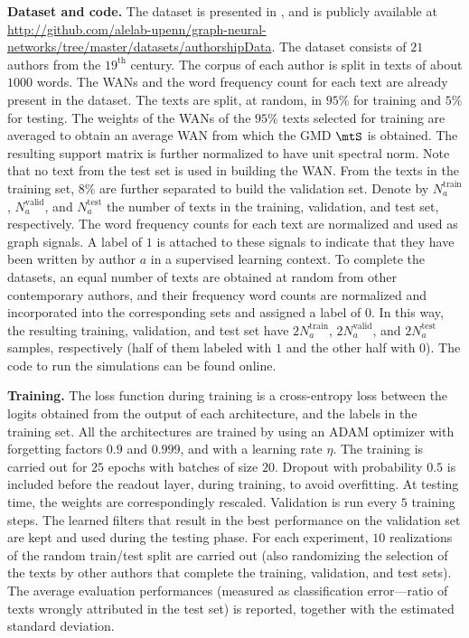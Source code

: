 \textbf{Dataset and code.} The dataset is presented in \cite{Segarra2015-Authorship}, and is publicly available at \url{http://github.com/alelab-upenn/graph-neural-networks/tree/master/datasets/authorshipData}. The dataset consists of $21$ authors from the $\text{19}^{\text{th}}$ century. The corpus of each author is split in texts of about $1000$ words. The WANs and the word frequency count for each text are already present in the dataset. The texts are split, at random, in $95\%$ for training and $5\%$ for testing. The weights of the WANs of the $95\%$ texts selected for training are averaged to obtain an average WAN from which the GMD $\mtS$ is obtained. The resulting support matrix is further normalized to have unit spectral norm. Note that no text from the test set is used in building the WAN. From the texts in the training set, $8\%$ are further separated to build the validation set. Denote by $N_{a}^{\text{train}}$, $N_{a}^{\text{valid}}$, and $N_{a}^{\text{test}}$ the number of texts in the training, validation, and test set, respectively.  The word frequency counts for each text are normalized and used as graph signals. A label of $1$ is attached to these signals to indicate that they have been written by author $a$ in a supervised learning context. To complete the datasets, an equal number of texts are obtained at random from other contemporary authors, and their frequency word counts are normalized and incorporated into the corresponding sets and assigned a label of $0$. In this way, the resulting training, validation, and test set have $2N_{a}^{\text{train}}$, $2N_{a}^{\text{valid}}$, and $2N_{a}^{\text{test}}$ samples, respectively (half of them labeled with $1$ and the other half with $0$). The code to run the simulations can be found online.

\textbf{Training.} The loss function during training is a cross-entropy loss between the logits obtained from the output of each architecture, and the labels in the training set. All the architectures are trained by using an ADAM optimizer \cite{Kingma15-ADAM} with forgetting factors $0.9$ and $0.999$, and with a learning rate $\eta$. The training is carried out for $25$ epochs with batches of size $20$. Dropout with probability $0.5$ is included before the readout layer, during training, to avoid overfitting. At testing time, the weights are correspondingly rescaled. Validation is run every $5$ training steps. The learned filters that result in the best performance on the validation set are kept and used during the testing phase. For each experiment, $10$ realizations of the random train/test split are carried out (also randomizing the selection of the texts by other authors that complete the training, validation, and test sets). The average evaluation performances (measured as classification error---ratio of texts wrongly attributed in the test set) is reported, together with the estimated standard deviation.

